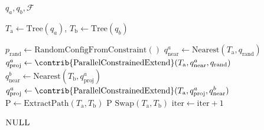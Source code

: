 \begin{algorithm}[b]
\begin{footnotesize}
\caption{Reparameterized RRT-Connect}
\label{alg:crrtc}
\begin{algorithmic}[1]
\Require $q_{a}, q_{b}, \mathcal{F}$

\State $T_{\text{a}} \gets \text{Tree}(q_{a})$, $T_{\text{b}} \gets \text{Tree}(q_{b})$

    \State $p_{\text{rand}} \gets \text{RandomConfigFromConstraint}()$ \label{algline:crrtc:rand}
    \State $q^a_{\text{near}} \gets \text{Nearest}(T_{\text{a}}, q_{\text{rand}})$ \label{algline:crrtc:near}
    \State $q^a_{\text{proj}} \gets \contrib{\text{ParallelConstrainedExtend}}
    (T_{\text{a}},
    q^a_{\text{near}}, q_{\text{rand}})$ \label{algline:crrtc:extend}
        \State $q^b_{\text{near}} \gets \text{Nearest}(T_{\text{b}}, q^a_{\text{proj}})$
        \State $q^a_{\text{proj}} \gets \contrib{\text{ParallelConstrainedExtend}}(
        T_{\text{a}},
        q^a_{\text{proj}}, q^b_{\text{near}})$
            \State $\text{P} \gets \text{ExtractPath}(T_{\text{a}},  
            T_{\text{b}})
            $
            \State \Return \textsc{P}
        \EndIf
    \EndWhile
    \State $\text{Swap}(T_{\text{a}}, T_{\text{b}})$
    \State $\text{iter} \gets \text{iter} + 1$
\EndWhile

\State \Return $\textsc{NULL}$
\end{algorithmic}
\end{footnotesize}
\end{algorithm}